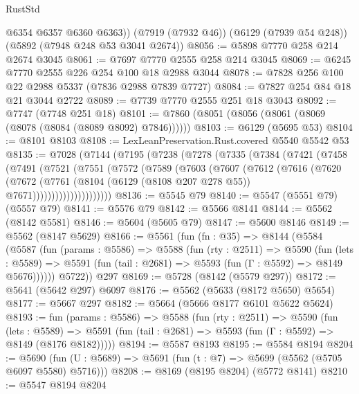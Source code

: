 \begin{lexlean}{RustStd}
\begin{coremodule}
        @6354
        @6357
        @6360
        @6363))
    (@7919 (@7932 @46))
    (@6129 (@7939 @54 @248))
    (@5892 (@7948 @248 @53 @3041 @2674))
@8056 := @5898 @7770 @258 @214 @2674 @3045
@8061 := @7697 @7770 @2555 @258 @214 @3045
@8069 := @6245 @7770 @2555 @226 @254 @100 @18 @2988 @3044
@8078 := @7828 @256 @100 @22 @2988 @5337 (@7836 @2988 @7839 @7727)
@8084 := @7827 @254 @84 @18 @21 @3044 @2722
@8089 := @7739 @7770 @2555 @251 @18 @3043
@8092 := @7747 (@7748 @251 @18)
@8101 := @7860 (@8051 (@8056 (@8061 (@8069 (@8078 (@8084 (@8089 @8092) @7846))))))
@8103 := @6129 (@5695 @53)
@8104 := @8101 @8103
@8108 := LexLeanPreservation.Rust.covered @5540 @5542 @53
@8135 := @7028
    (@7144
      (@7195
        (@7238
          (@7278
            (@7335
              (@7384
                (@7421
                  (@7458
                    (@7491
                      (@7521
                        (@7551
                          (@7572
                            (@7589
                              (@7603
                                (@7607
                                  (@7612
                                    (@7616
                                      (@7620
                                        (@7672
                                          (@7761
                                            (@8104
                                              (@6129 (@8108 @207 @278 @55))
                                              @7671)))))))))))))))))))))
@8136 := @5545 @79
@8140 := @5547 (@5551 @79) (@5557 @79)
@8141 := @5576 @79
@8142 := @5566 @8141
@8144 := @5562 (@8142 @5581)
@8146 := @5604 (@5605 @79)
@8147 := @5600 @8146
@8149 := @5562 (@8147 @5629)
@8166 := @5561
    (fun (fn : @35) =>
    @8144
      (@5584
        (@5587
          (fun (params : @5586) =>
          @5588
            (fun (rty : @2511) =>
            @5590
              (fun (lets : @5589) =>
              @5591 (fun (tail : @2681) => @5593 (fun (Γ : @5592) => @8149 @5676))))))
        @5722))
    @297
@8169 := @5728 (@8142 (@5579 @297))
@8172 := @5641 (@5642 @297) @6097
@8176 := @5562 (@5633 (@8172 @5650) @5654)
@8177 := @5667 @297
@8182 := @5664 (@5666 @8177 @6101 @5622 @5624)
@8193 := fun (params : @5586) =>
  @5588
    (fun (rty : @2511) =>
    @5590
      (fun (lets : @5589) =>
      @5591 (fun (tail : @2681) => @5593 (fun (Γ : @5592) => @8149 (@8176 @8182)))))
@8194 := @5587 @8193
@8195 := @5584 @8194
@8204 := @5690 (fun (U : @5689) => @5691 (fun (t : @7) => @5699 (@5562 (@5705 @6097 @5580) @5716)))
@8208 := @8169 (@8195 @8204) (@5772 @8141)
@8210 := @5547 @8194 @8204

\end{coremodule}
\end{lexlean}
